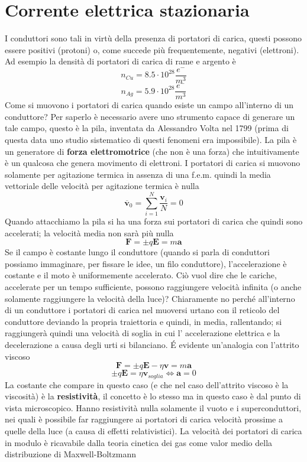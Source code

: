 \documentclass[
10pt, %
a4paper, %
oneside, %
headinclude,footinclude, %
BCOR5mm, %
]{scrartcl}
\begin{document}
\section{Corrente elettrica stazionaria}
I conduttori sono tali in virtù della presenza di portatori di carica, questi possono essere positivi (protoni) o, come succede più frequentemente, negativi (elettroni). Ad esempio la densità di portatori di carica di rame e argento è
\[n_{Cu} = 8.5 \cdot 10^{28}\frac{e^-}{m^3}\]
\[n_{Ag} = 5.9\cdot 10^{28}\frac{e^-}{m^3}\]
Come si muovono i portatori di carica quando esiste un campo all'interno di un conduttore? Per saperlo è necessario avere uno strumento capace di generare un tale campo, questo è la pila, inventata da Alessandro Volta nel 1799 (prima di questa data uno studio sistematico di questi fenomeni era impossibile). La pila è un generatore di \textbf{forza elettromotrice} (che non è una forza) che intuitivamente è un qualcosa che genera movimento di elettroni. I portatori di carica si muovono solamente per agitazione termica in assenza di una f.e.m. quindi la media vettoriale delle velocità per agitazione termica è nulla
\[\mathbf{\overline{v}}_0= \sum_{i = 1}^{N}\frac{\mathbf{v}_i}{N}=0\]
Quando attacchiamo la pila si ha una forza sui portatori di carica che quindi sono accelerati; la velocità media non sarà più nulla
\[\mathbf{F}= \pm q\mathbf{E}= m \mathbf{a}\]
Se il campo è costante lungo il conduttore (quando si parla di conduttori possiamo immaginare, per fissare le idee, un filo conduttore), l'accelerazione è costante e il moto è uniformemente accelerato. Ciò vuol dire che le cariche, accelerate per un tempo sufficiente, possono raggiungere velocità infinita (o anche solamente raggiungere la velocità della luce)? Chiaramente no perché all'interno di un conduttore i portatori di carica nel muoversi urtano con il reticolo del conduttore deviando la propria traiettoria e quindi, in media, rallentando; si raggiungerà quindi una velocità di soglia in cui l' accelerazione elettrica e la decelerazione a causa degli urti si bilanciano. \'E evidente un'analogia con l'attrito viscoso
\[\mathbf{F} = \pm q\mathbf{E}-\eta\mathbf{v}=m\mathbf{a}\]
\[\pm q\mathbf{E}=\eta\mathbf{v}_{soglia} \Leftrightarrow \mathbf{a}= 0\]
La costante che compare in questo caso (e che nel caso dell'attrito viscoso è la viscosità) è la \textbf{resistività}, il concetto è lo stesso ma in questo caso è dal punto di vista microscopico. Hanno resistività nulla solamente il vuoto e i superconduttori, nei quali è possibile far raggiungere ai portatori di carica velocità prossime a quelle della luce (a causa di effetti relativistici). La velocità dei portatori di carica in modulo è ricavabile dalla teoria cinetica dei gas come valor medio della distribuzione di Maxwell-Boltzmann
\end{document}
